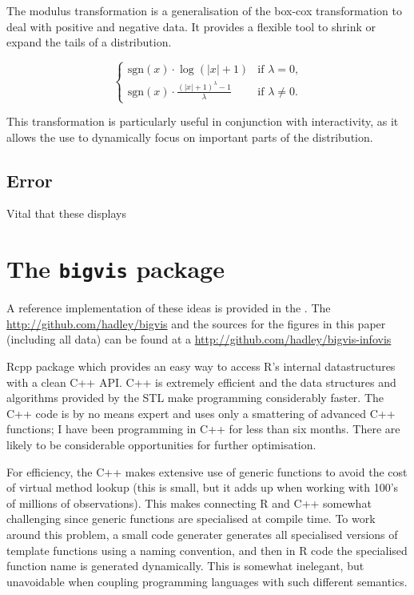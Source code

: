 \documentclass[journal]{vgtc}                %
\begin{document}
The modulus transformation \citep{john:1980} is a generalisation of the box-cox transformation \citep{box:1964} to deal with positive and negative data. It provides a flexible tool to shrink or expand the tails of a distribution.

\begin{equation}
\begin{cases} 
  \text{sgn}(x) \cdot \log(|x| + 1) & \text{if $\lambda = 0$,} \\
  \text{sgn}(x) \cdot \frac{(|x| + 1)^\lambda - 1}{\lambda} &\text{if $\lambda \ne 0$.}
\end{cases}
\end{equation}

This transformation is particularly useful in conjunction with interactivity, as it allows the use to dynamically focus on important parts of the distribution.

\subsection{Error}

Vital that these displays

\section{The {\tt bigvis} package}
\label{sec:bigvis}

A reference implementation of these ideas is provided in the .  The \url{http://github.com/hadley/bigvis} and the sources for the figures in this paper (including all data) can be found at a \url{http://github.com/hadley/bigvis-infovis}

Rcpp package which provides an easy way to access R's internal datastructures with a clean C++ API.  C++ is extremely efficient and the data structures and algorithms provided by the STL make programming considerably faster.  The C++ code is by no means expert and uses only a smattering of advanced C++ functions; I have been programming in C++ for less than six months. There are likely to be considerable opportunities for further optimisation.

For efficiency, the C++ makes extensive use of generic functions to avoid the cost of virtual method lookup (this is small, but it adds up when working with 100's of millions of observations).  This makes connecting R and C++ somewhat challenging since generic functions are specialised at compile time. To work around this problem, a small code generater generates all specialised versions of template functions using a naming convention, and then in R code the specialised function name is generated dynamically.  This is somewhat inelegant, but unavoidable when coupling programming languages with such different semantics.
\end{document}
